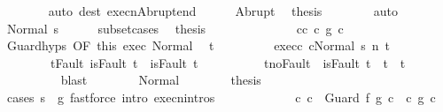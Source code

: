 \begin{isabellebody}
\ \ \ \ \ \ \isamarkupfalse%
\ {\isacharparenleft}auto\ dest{\isacharcolon}\ execn{\isacharunderscore}Abrupt{\isacharunderscore}end{\isacharparenright}\isanewline
\ \ \ \ \isamarkupfalse%
\ Abrupt\ \isamarkupfalse%
\ {\isacharquery}thesis\isanewline
\ \ \ \ \ \ \isamarkupfalse%
\ auto\isanewline
\ \ \isamarkupfalse%
\isanewline
\ \ \ \ \isamarkupfalse%
\ {\isacharparenleft}Normal\ s{\isacharprime}{\isacharparenright}\isanewline
\ \ \ \ \isamarkupfalse%
\ subset{\isacharunderscore}cases\ \isamarkupfalse%
\ {\isacharquery}thesis\isanewline
\ \ \ \ \isamarkupfalse%
\ \isanewline
\ \ \ \ \ \ \isamarkupfalse%
\ c{\isacharunderscore}c{\isacharprime}{\isacharcolon}\ {\isachardoublequoteopen}c\ {\isasymsubseteq}\isactrlsub g\ c{\isacharprime}{\isachardoublequoteclose}\isanewline
\ \ \ \ \ \ \isamarkupfalse%
\ Guard{\isachardot}hyps\ {\isacharbrackleft}OF\ this\ exec{\isacharbrackright}\ Normal\ \isamarkupfalse%
\ t{\isacharprime}\ \isanewline
\ \ \ \ \ \ \ \ exec{\isacharunderscore}c{\isacharprime}{\isacharcolon}\ {\isachardoublequoteopen}{\isasymGamma}{\isasymturnstile}{\isasymlangle}c{\isacharprime}{\isacharcomma}Normal\ s{\isacharprime}{\isasymrangle}\ {\isacharequal}n{\isasymRightarrow}\ t{\isacharprime}{\isachardoublequoteclose}\ \isanewline
\ \ \ \ \ \ \ \ t{\isacharunderscore}Fault{\isacharcolon}\ {\isachardoublequoteopen}isFault\ t\ {\isasymlongrightarrow}\ isFault\ t{\isacharprime}{\isachardoublequoteclose}\ \ \isanewline
\ \ \ \ \ \ \ \ t{\isacharunderscore}noFault{\isacharcolon}\ {\isachardoublequoteopen}{\isasymnot}\ isFault\ t{\isacharprime}\ {\isasymlongrightarrow}\ t{\isacharprime}\ {\isacharequal}\ t{\isachardoublequoteclose}\ \isanewline
\ \ \ \ \ \ \ \ \isamarkupfalse%
\ blast\isanewline
\ \ \ \ \ \ \isamarkupfalse%
\ Normal\isanewline
\ \ \ \ \ \ \isamarkupfalse%
\ {\isacharquery}thesis\isanewline
\ \ \ \ \ \ \ \ \isamarkupfalse%
\ {\isacharparenleft}cases\ {\isachardoublequoteopen}s{\isacharprime}\ {\isasymin}\ g{\isacharprime}{\isachardoublequoteclose}{\isacharparenright}\ {\isacharparenleft}fastforce\ intro{\isacharcolon}\ execn{\isachardot}intros{\isacharparenright}{\isacharplus}\isanewline
\ \ \ \ \isamarkupfalse%
\isanewline
\ \ \ \ \ \ \isamarkupfalse%
\ {\isachardoublequoteopen}{\isasymexists}c{\isacharprime}{\isacharprime}{\isachardot}\ c\ {\isacharequal}\ Guard\ f{\isacharprime}\ g{\isacharprime}\ c{\isacharprime}{\isacharprime}\ {\isasymand}\ {\isacharparenleft}c{\isacharprime}{\isacharprime}\ {\isasymsubseteq}\isactrlsub g\ c{\isacharprime}{\isacharparenright}{\isachardoublequoteclose}\isanewline

\end{isabellebody}

